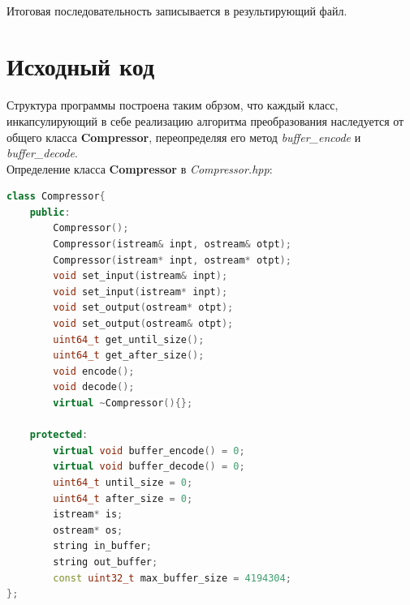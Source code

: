 {}\\

Итоговая последовательность записывается в результирующий файл.

\pagebreak

\section{Исходный код}

Структура программы построена таким обрзом, что каждый класс, инкапсулирующий в себе реализацию алгоритма преобразования наследуется от общего класса {\bfseries Compressor}, переопределяя его метод {\it buffer\_encode} и {\it buffer\_decode}. \\
 
Определение класса {\bfseries Compressor} в {\it Compressor.hpp}:

\begin{lstlisting}[language=C++]
class Compressor{
    public:
        Compressor(); 
        Compressor(istream& inpt, ostream& otpt); 
        Compressor(istream* inpt, ostream* otpt); 
        void set_input(istream& inpt); 
        void set_input(istream* inpt); 
        void set_output(ostream* otpt); 
        void set_output(ostream& otpt); 
        uint64_t get_until_size();
        uint64_t get_after_size();
        void encode(); 
        void decode(); 
        virtual ~Compressor(){}; 
                
    protected:
        virtual void buffer_encode() = 0;
        virtual void buffer_decode() = 0;
        uint64_t until_size = 0;
        uint64_t after_size = 0;
        istream* is;
        ostream* os;
        string in_buffer;
        string out_buffer;
        const uint32_t max_buffer_size = 4194304;
};
\end{lstlisting}

